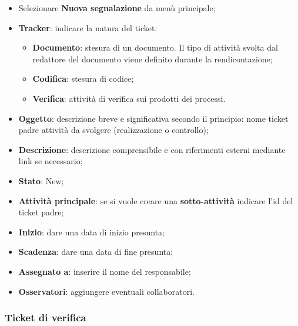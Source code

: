 		\begin{itemize}
		
		\item Selezionare \textbf{Nuova segnalazione} da men\`{u} principale; 
		\item \textbf{Tracker}: indicare la natura del ticket: 
		\begin{itemize}
	\item \textbf{Documento}: stesura di un documento. Il tipo di attivit\`{a} svolta dal redattore del documento viene definito durante la rendicontazione; 
	\item \textbf{Codifica}: stesura di codice; 
	\item \textbf{Verifica}: attivit\`{a} di verifica sui prodotti dei processi. 

	\end{itemize}

\item \textbf{Oggetto}: descrizione breve e significativa secondo il principio: nome ticket padre attivit\`{a} da svolgere (realizzazione o controllo); 
\item \textbf{Descrizione}: descrizione comprensibile e con riferimenti esterni mediante link se 
necessario; 

\item \textbf{Stato}: New; 
\item \textbf{Attivit\`{a} principale}: se si vuole creare una \textbf{sotto-attivit\`{a}} indicare l’id del ticket 
padre; 
\item \textbf{Inizio}: dare una data di inizio presunta; 
\item \textbf{Scadenza}: dare una data di fine presunta; 
\item \textbf{Assegnato a}: inserire il nome del responsabile; 
\item \textbf{Osservatori}: aggiungere eventuali collaboratori. 
\end{itemize} 

\subsubsection{Ticket di verifica}


